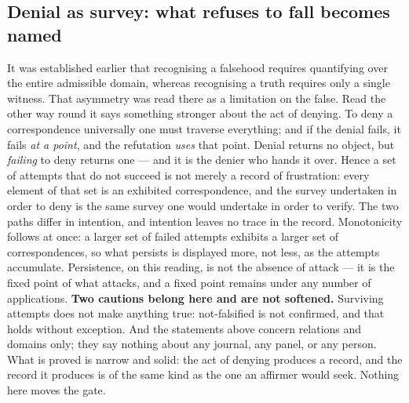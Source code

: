\documentclass[11pt]{article}
\theoremstyle{definition}\newtheorem{deriv}{Derivation}
\begin{document}
\subsection*{Denial as survey: what refuses to fall becomes named}It was established earlier that recognising a falsehood requires quantifying over the entire admissible domain, whereas recognising a truth requires only a single witness. That asymmetry was read there as a limitation on the false. Read the other way round it says something stronger about the act of denying. To deny a correspondence universally one must traverse everything; and if the denial fails, it fails \emph{at a point}, and the refutation \emph{uses} that point. Denial returns no object, but \emph{failing} to deny returns one --- and it is the denier who hands it over. Hence a set of attempts that do not succeed is not merely a record of frustration: every element of that set is an exhibited correspondence, and the survey undertaken in order to deny is the same survey one would undertake in order to verify. The two paths differ in intention, and intention leaves no trace in the record. Monotonicity follows at once: a larger set of failed attempts exhibits a larger set of correspondences, so what persists is displayed more, not less, as the attempts accumulate. Persistence, on this reading, is not the absence of attack --- it is the fixed point of what attacks, and a fixed point remains under any number of applications. \textbf{Two cautions belong here and are not softened.} Surviving attempts does not make anything true: not-falsified is not confirmed, and that holds without exception. And the statements above concern relations and domains only; they say nothing about any journal, any panel, or any person. What is proved is narrow and solid: the act of denying produces a record, and the record it produces is of the same kind as the one an affirmer would seek. Nothing here moves the gate.
\end{document}
